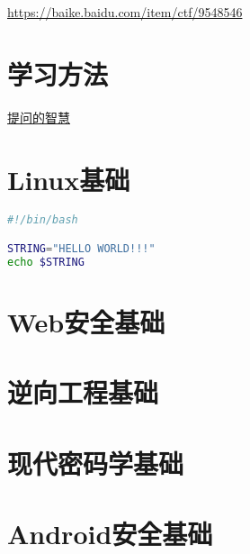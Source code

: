 \indent \href{https://baike.baidu.com/item/ctf/9548546}{https://baike.baidu.com/item/ctf/9548546}

\section{学习方法}
\indent \setlength{\parindent}{2em}
\indent \href{https://github.com/ryanhanwu/How-To-Ask-Questions-The-Smart-Way}{提问的智慧}

\section{Linux基础}
\indent \setlength{\parindent}{2em}

\begin{lstlisting}[language=bash, style=customStyleBashDark, caption=Snippet title]
#!/bin/bash

STRING="HELLO WORLD!!!"
echo $STRING 
\end{lstlisting}

\section{Web安全基础}
\indent \setlength{\parindent}{2em}

\section{逆向工程基础}
\indent \setlength{\parindent}{2em}

\section{现代密码学基础}
\indent \setlength{\parindent}{2em}

\section{Android安全基础}
\indent \setlength{\parindent}{2em}
